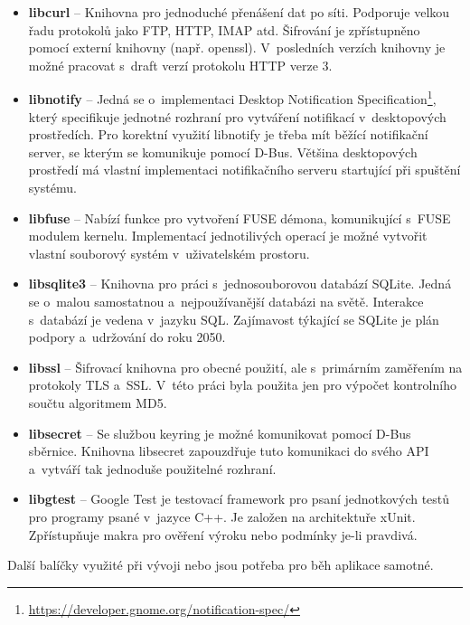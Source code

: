 \begin{itemize}
    \item \textbf{libcurl} – Knihovna pro jednoduché přenášení dat po síti. Podporuje velkou řadu protokolů jako FTP, HTTP, IMAP atd. Šifrování je zpřístupněno pomocí
    externí knihovny (např. openssl). V posledních verzích knihovny je možné pracovat s draft verzí protokolu HTTP verze 3. \cite{libcurl}
    \item \textbf{libnotify} – Jedná se o implementaci Desktop Notification Specification\footnote{\url{https://developer.gnome.org/notification-spec/}}, který specifikuje
    jednotné rozhraní pro vytváření notifikací v desktopových prostředích. Pro korektní využití libnotify je třeba mít běžící notifikační server, se kterým se komunikuje
    pomocí D-Bus. Většina desktopových prostředí má vlastní implementaci notifikačního serveru startující při spuštění systému. \cite{libnotify}
    \item \textbf{libfuse} – Nabízí funkce pro vytvoření FUSE démona, komunikující s FUSE modulem kernelu. Implementací jednotilivých operací je možné vytvořit vlastní
    souborový systém v uživatelském prostoru. \cite{libfuse}
    \item \textbf{libsqlite3} – Knihovna pro práci s jednosouborovou databází SQLite. Jedná se o malou samostatnou a nejpoužívanější databázi na světě. Interakce s databází
    je vedena v jazyku SQL. Zajímavost týkající se SQLite je plán podpory a udržování do roku 2050. \cite{libsqlite}
    \item \textbf{libssl} – Šifrovací knihovna pro obecné použití, ale s primárním zaměřením na protokoly TLS a SSL. V této práci byla použita jen pro výpočet kontrolního
    součtu algoritmem MD5. \cite{libssl}
    \item \textbf{libsecret} – Se službou keyring je možné komunikovat pomocí D-Bus sběrnice. Knihovna libsecret zapouzdřuje tuto komunikaci do svého API a vytváří tak
    jednoduše použitelné rozhraní. \cite{libsecret}
    \item \textbf{libgtest} – Google Test je testovací framework pro psaní jednotkových testů pro programy psané v jazyce C++. Je založen na architektuře xUnit. Zpřístupňuje
    makra pro ověření výroku nebo podmínky je-li pravdivá. \cite{libgtest}
\end{itemize}

\noindent Další balíčky využité při vývoji nebo jsou potřeba pro běh aplikace samotné.

